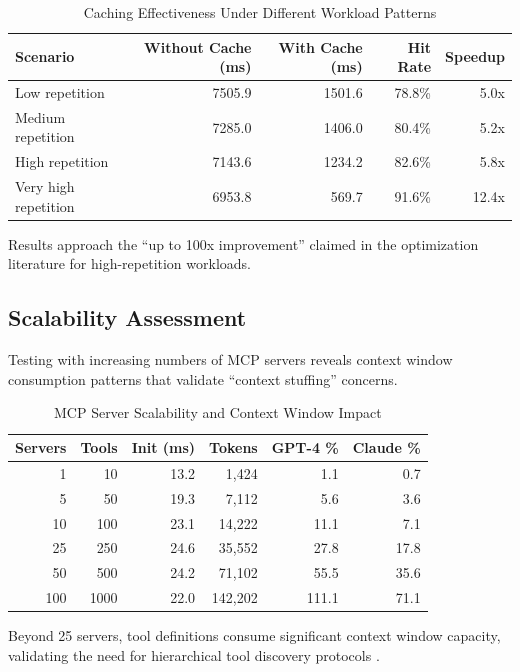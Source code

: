 \begin{table}[h]
\centering
\caption{Caching Effectiveness Under Different Workload Patterns}
\label{tab:caching_benchmark}
\begin{tabular}{lrrrr}
\toprule
\textbf{Scenario} & \textbf{Without Cache (ms)} & \textbf{With Cache (ms)} & \textbf{Hit Rate} & \textbf{Speedup} \\
\midrule
Low repetition & 7505.9 & 1501.6 & 78.8\% & 5.0x \\
Medium repetition & 7285.0 & 1406.0 & 80.4\% & 5.2x \\
High repetition & 7143.6 & 1234.2 & 82.6\% & 5.8x \\
Very high repetition & 6953.8 & 569.7 & 91.6\% & 12.4x \\
\bottomrule
\end{tabular}
\end{table}

Results approach the ``up to 100x improvement'' claimed in the optimization literature \cite{catchmetrics2025} for high-repetition workloads.

\subsection{Scalability Assessment}

Testing with increasing numbers of MCP servers reveals context window consumption patterns that validate ``context stuffing'' concerns.


\begin{table}[h]
\centering
\caption{MCP Server Scalability and Context Window Impact}
\label{tab:scalability_benchmark}
\begin{tabular}{rrrrrr}
\toprule
\textbf{Servers} & \textbf{Tools} & \textbf{Init (ms)} & \textbf{Tokens} & \textbf{GPT-4 \%} & \textbf{Claude \%} \\
\midrule
1 & 10 & 13.2 & 1,424 & 1.1 & 0.7 \\
5 & 50 & 19.3 & 7,112 & 5.6 & 3.6 \\
10 & 100 & 23.1 & 14,222 & 11.1 & 7.1 \\
25 & 250 & 24.6 & 35,552 & 27.8 & 17.8 \\
50 & 500 & 24.2 & 71,102 & 55.5 & 35.6 \\
100 & 1000 & 22.0 & 142,202 & 111.1 & 71.1 \\
\bottomrule
\end{tabular}
\end{table}

Beyond 25 servers, tool definitions consume significant context window capacity, validating the need for hierarchical tool discovery protocols \cite{anthropic2025code, datasciencedojo2025}.

